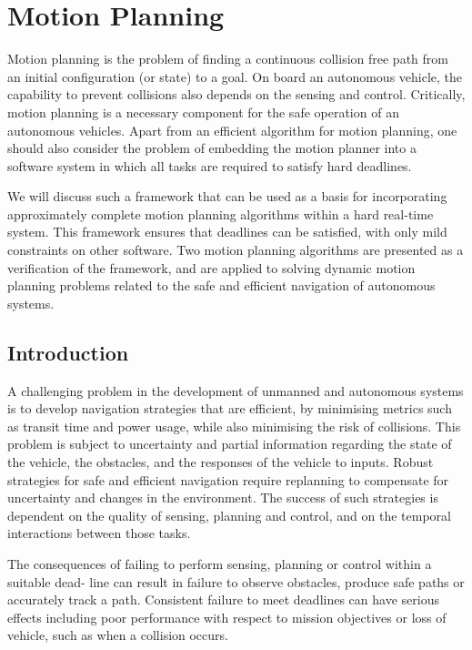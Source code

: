 \section{Motion Planning}
\label{motion_planning}

Motion planning is the problem of finding a continuous collision free path from an initial
configuration (or state) to a goal. On board an autonomous vehicle, the capability to prevent
collisions also depends on the sensing and control. Critically, motion planning is a necessary
component for the safe operation of an autonomous vehicles. Apart from an efficient algorithm
for motion planning, one should also consider  the problem of embedding the motion planner 
into a software system in which all tasks are required to satisfy hard deadlines. 

We will discuss such a  framework that can be used as a basis for incorporating approximately complete motion planning algorithms within a
hard real-time system. This framework ensures that deadlines can be satisfied, with only mild
constraints on other software. Two motion planning algorithms are presented as a verification
of the framework, and are applied to solving dynamic motion planning problems related to the
safe and efficient navigation of autonomous systems.


\subsection{Introduction}
\label{introduction_motion_planning}
A challenging problem in the development of unmanned and autonomous systems is to develop
navigation strategies that are efficient, by minimising metrics such as transit time and power
usage, while also minimising the risk of collisions. This problem is subject to uncertainty
and partial information regarding the state of the vehicle, the obstacles, and the responses of
the vehicle to inputs. Robust strategies for safe and efficient navigation require replanning to
compensate for uncertainty and changes in the environment. The success of such strategies
is dependent on the quality of sensing, planning and control, and on the temporal interactions
between those tasks.


The consequences of failing to perform sensing, planning or control within a suitable dead-
line can result in failure to observe obstacles, produce safe paths or accurately track a path.
Consistent failure to meet deadlines can have serious effects including poor performance with
respect to mission objectives or loss of vehicle, such as when a collision occurs.

